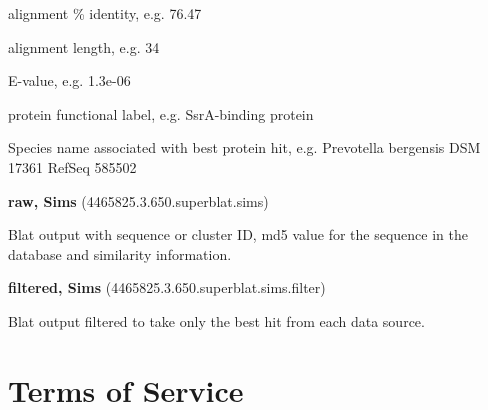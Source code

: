 \documentclass[12pt,fullpage]{report}
\begin{document}
\begin{appendices}
\begin{mdframed}
    alignment \% identity, e.g. 76.47

    alignment length, e.g. 34

    E-value, e.g. 1.3e-06

    protein functional label, e.g. SsrA-binding protein

    Species name associated with best protein hit, e.g. Prevotella bergensis DSM 17361 RefSeq 585502


\textbf{raw, Sims} (4465825.3.650.superblat.sims)

Blat output with sequence or cluster ID, md5 value for the sequence in the database and similarity information.

\textbf{filtered, Sims} (4465825.3.650.superblat.sims.filter)

Blat output filtered to take only the best hit from each data source.
\end{mdframed}
\chapter{Terms of Service}


\end{appendices}
\end{document}
